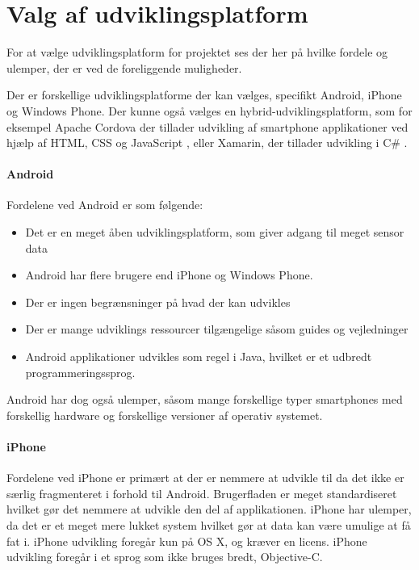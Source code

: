 \section{Valg af udviklingsplatform}\label{sec:valg_af_android}
For at vælge udviklingsplatform for projektet ses der her på hvilke fordele og ulemper, der er ved de foreliggende muligheder.

Der er forskellige udviklingsplatforme der kan vælges, specifikt Android, iPhone og Windows Phone.
Der kunne også vælges en hybrid-udviklingsplatform, som for eksempel Apache Cordova der tillader udvikling af smartphone applikationer ved hjælp af HTML, CSS og JavaScript \citep{misc:apachecordova}, eller Xamarin, der tillader udvikling i C\# \citep{misc:xamarin}.

\paragraph{Android}
Fordelene ved Android er som følgende:
\begin{itemize}
\item Det er en meget åben udviklingsplatform, som giver adgang til meget sensor data
\item Android har flere brugere end iPhone og Windows Phone.
\item Der er ingen begrænsninger på hvad der kan udvikles
\item Der er mange udviklings ressourcer tilgængelige såsom guides og vejledninger
\item Android applikationer udvikles som regel i Java, hvilket er et udbredt programmeringssprog.
\end{itemize}

Android har dog også ulemper, såsom mange forskellige typer smartphones med forskellig hardware og forskellige versioner af operativ systemet.

\paragraph{iPhone}
Fordelene ved iPhone er primært at der er nemmere at udvikle til da det ikke er særlig fragmenteret i forhold til Android. 
Brugerfladen er meget standardiseret hvilket gør det nemmere at udvikle den del af applikationen. 
iPhone har ulemper, da det er et meget mere lukket system hvilket gør at data kan være umulige at få fat i. iPhone udvikling foregår kun på OS X, og kræver en licens. iPhone udvikling foregår i et sprog som ikke bruges bredt, Objective-C.

